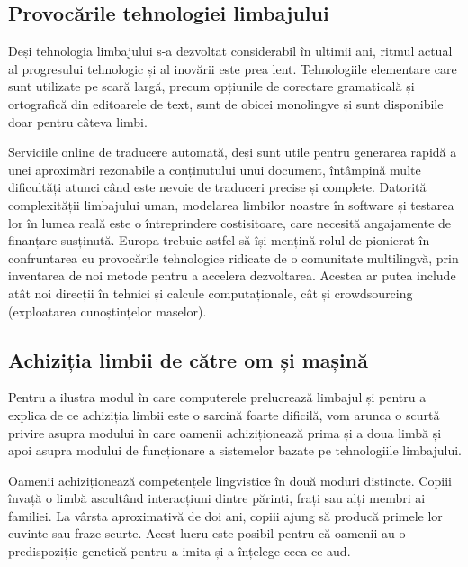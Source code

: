 \begin{multicols}{2}
\subsection{Provocările tehnologiei limbajului}

Deși tehnologia limbajului s-a dezvoltat considerabil în ultimii ani, ritmul actual al progresului tehnologic și al inovării este prea lent. Tehnologiile elementare care sunt utilizate pe scară largă, precum opțiunile de corectare gramaticală și ortografică din editoarele de text, sunt de obicei monolingve și sunt disponibile doar pentru câteva limbi. 


Serviciile online de traducere automată, deși sunt utile pentru generarea rapidă a unei aproximări rezonabile a conținutului unui document, întâmpină multe dificultăți atunci când este nevoie de traduceri precise și complete. Datorită complexității limbajului uman, modelarea limbilor noastre în software și testarea lor în lumea reală este o întreprindere costisitoare, care necesită angajamente de finanțare susținută. Europa trebuie astfel să își mențină rolul de pionierat în confruntarea cu provocările tehnologice ridicate de o comunitate multilingvă, prin inventarea de noi metode pentru a accelera dezvoltarea. Acestea ar putea include atât noi direcții în tehnici și calcule computaționale, cât și crowdsourcing (exploatarea cunoștințelor maselor).

\subsection{Achiziția limbii de către om și mașină}

Pentru a ilustra modul în care computerele prelucrează limbajul și pentru a explica de ce achiziția limbii este o sarcină foarte dificilă, vom arunca o scurtă privire asupra modului în care oamenii achiziționează prima și a doua limbă și apoi asupra modului de funcționare a sistemelor bazate pe tehnologiile limbajului.


Oamenii achiziționează competențele lingvistice în două moduri distincte. Copiii învață o limbă ascultând interacțiuni dintre părinți, frați sau alți membri ai familiei. La vârsta aproximativă de doi ani, copiii ajung să producă primele lor cuvinte sau fraze scurte. Acest lucru este posibil pentru că oamenii au o predispoziție genetică pentru a imita și a înțelege ceea ce aud.


\end{multicols}
